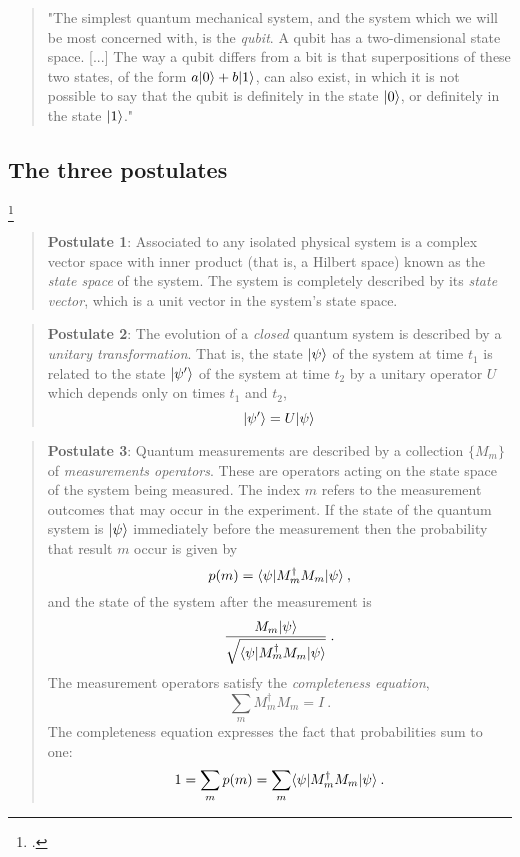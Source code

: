 \label{App:appendixB}
\begin{quotation}
	"The simplest quantum mechanical system, and the system which we will be most concerned with, is the \emph{qubit}. A qubit has a two-dimensional state space. [...] 
	The way a qubit differs from a bit is that superpositions of these two states, of the form $a|0 \rangle + b|1 \rangle$, can also exist, in which it is not possible to say that the qubit is definitely in the state $|0 \rangle$, or definitely in the state $|1 \rangle$."
	\cite{NC10}
\end{quotation}

\subsection{The three postulates}\footcite{NC10}
	\begin{quote}
		\textbf{Postulate 1}: Associated to any isolated physical system is a complex vector space with inner product (that is, a Hilbert space) known as the \emph{state space} of the system. 
		The system is completely described by its \emph{state vector}, which is a unit vector in the system's state space. 
	\end{quote}
	
	\begin{quote}
		\textbf{Postulate 2}: The evolution of a \emph{closed} quantum system is described by a \emph{unitary transformation}. That is, the state $|\psi \rangle$ of the system at time $t_1$ is related to the state $|\psi' \rangle$ of the system at time $t_2$ by a unitary operator $U$ which depends only on times $t_1$ and $t_2$,
		$$ |\psi' \rangle = U|\psi \rangle $$
	\end{quote}
	
	\begin{quote}
		\textbf{Postulate 3}: Quantum measurements are described by a collection $\{M_m\}$ of \emph{measurements operators}. 
		These are operators acting on the state space of the system being measured. 
		The index $m$ refers to the measurement outcomes that may occur in the experiment. If the state of the quantum system is $|\psi \rangle$ immediately before the measurement then the probability that result $m$ occur is given by 
		$$ p(m) = \langle \psi|M_m^{\dagger}M_m|\psi \rangle \: ,$$
		and the state of the system after the measurement is 
		$$ \frac{M_m|\psi \rangle}{\sqrt{\langle \psi|M_m^{\dagger}M_m|\psi \rangle}} \: . $$
		The measurement operators satisfy the \emph{completeness equation},
		$$\sum_m  M_m^{\dagger}M_m = I \: .$$
		The completeness equation expresses the fact that probabilities sum to one:
		$$ 1 = \sum_m p(m) = \sum_m  \langle \psi|M_m^{\dagger}M_m|\psi \rangle \: .$$ 
	\end{quote}
	

